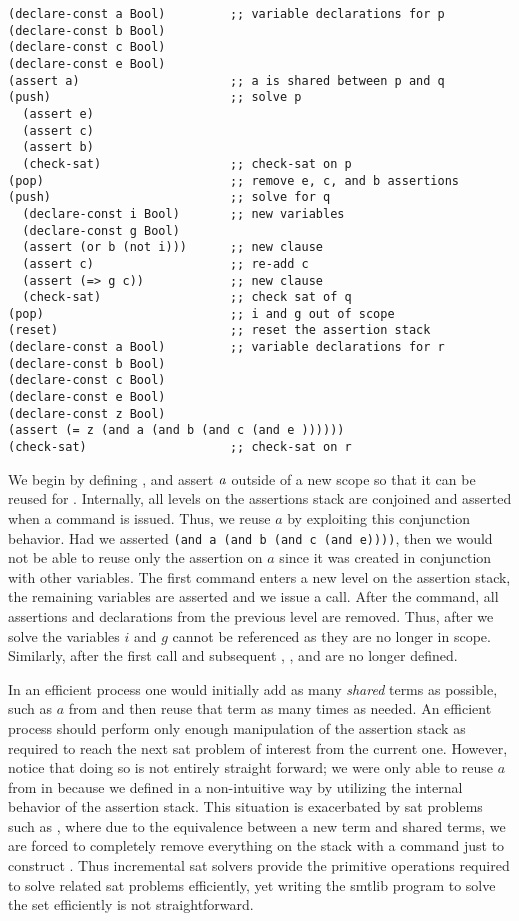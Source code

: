 \begin{lstlisting}[columns=flexible,keepspaces=true,language=SMTLIB]
(declare-const a Bool)         ;; variable declarations for p
(declare-const b Bool)
(declare-const c Bool)
(declare-const e Bool)
(assert a)                     ;; a is shared between p and q
(push)                         ;; solve p
  (assert e)
  (assert c)
  (assert b)
  (check-sat)                  ;; check-sat on p
(pop)                          ;; remove e, c, and b assertions
(push)                         ;; solve for q
  (declare-const i Bool)       ;; new variables
  (declare-const g Bool)
  (assert (or b (not i)))      ;; new clause
  (assert c)                   ;; re-add c
  (assert (=> g c))            ;; new clause
  (check-sat)                  ;; check sat of q
(pop)                          ;; i and g out of scope
(reset)                        ;; reset the assertion stack
(declare-const a Bool)         ;; variable declarations for r
(declare-const b Bool)
(declare-const c Bool)
(declare-const e Bool)
(declare-const z Bool)
(assert (= z (and a (and b (and c (and e ))))))
(check-sat)                    ;; check-sat on r
\end{lstlisting}

We begin by defining \pV{}, and assert $\mathit{a}$ outside of a new scope so that
it can be reused for \qV{}. Internally, all levels on the assertions stack are
conjoined and asserted when a  command is issued. Thus, we reuse
$a$ by exploiting this conjunction behavior. Had we asserted
\lstinline{(and a (and b (and c (and e))))}, then we would not be able to reuse
only the assertion on $a$ since it was created in conjunction with other
variables. The first  command enters a new level on the assertion
stack, the remaining variables are asserted and we issue a  call.
After the  command, all assertions and declarations from the previous
level are removed. Thus, after we solve \qV{} the variables $i$ and $g$ cannot
be referenced as they are no longer in scope. Similarly, after the first
 call and subsequent , \eV{}, \cV{} and \bV{} are no
longer defined.

In an efficient process one would initially add as many \emph{shared} terms as
possible, such as $a$ from \pV{} and then reuse that term as many times as
needed. An efficient process should perform only enough manipulation of the
assertion stack as required to reach the next \ac{sat} problem of interest from
the current one. However, notice that doing so is not entirely straight forward;
we were only able to reuse $a$ from \pV{} in \qV{} because we defined \pV{} in a
non-intuitive way by utilizing the internal behavior of the assertion stack.
This situation is exacerbated by \ac{sat} problems such as \rV{}, where due to
the equivalence between a new term and shared terms, we are forced to completely
remove everything on the stack with a  command just to construct
\rV{}. Thus incremental \ac{sat} solvers provide the primitive operations
required to solve related \ac{sat} problems efficiently, yet writing the
\acl{smtlib} program to solve the set efficiently is not straightforward.

